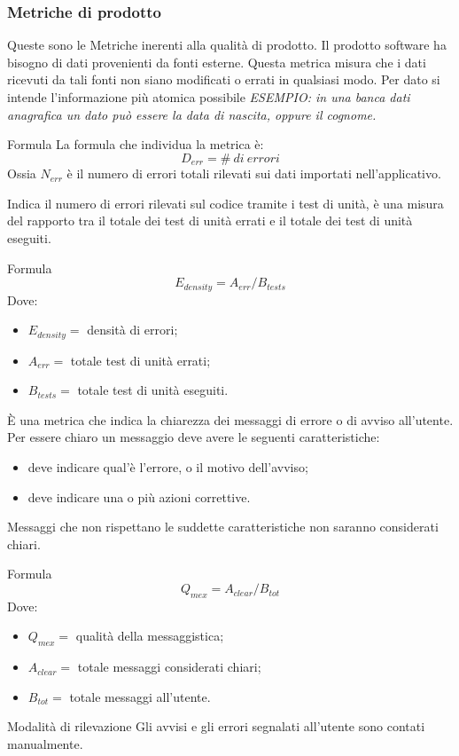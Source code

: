 \subsubsection{Metriche di prodotto}
Queste sono le Metriche inerenti alla qualità di prodotto.
Il prodotto software ha bisogno di dati provenienti da fonti esterne. Questa 
metrica misura che i dati ricevuti da tali fonti non siano modificati o errati 
in qualsiasi modo. Per dato si intende l'informazione più atomica possibile
\textit{ESEMPIO: in una banca dati anagrafica un dato può essere la data di 
nascita, oppure il cognome.}
\par{Formula}
La formula che individua la metrica è:
\begin{displaymath}
  D_{err} = \#\ di\ errori
\end{displaymath}
Ossia $N_{err}$ è il numero di errori totali rilevati sui dati importati 
nell'applicativo.

Indica il numero di errori rilevati sul codice tramite i test di unità, è una 
misura del rapporto tra il totale dei test di unità errati e il totale dei test 
di unità eseguiti.
\par{Formula}
\begin{displaymath}
  E_{density} = A_{err}/B_{tests}
\end{displaymath}
Dove:
\begin{itemize}
  \item[] $E_{density} =$ densità di errori;
  \item[] $A_{err} =$ totale test di unità errati;  
  \item[] $B_{tests} =$ totale test di unità eseguiti.
\end{itemize}

È una metrica che indica la chiarezza dei messaggi di errore o di avviso 
all'utente. Per essere chiaro un messaggio deve avere le seguenti 
caratteristiche:
\begin{itemize}
  \item deve indicare qual'è l'errore, o il motivo dell'avviso;
  \item deve indicare una o più azioni correttive.
\end{itemize}
Messaggi che non rispettano le suddette caratteristiche non saranno considerati 
chiari.
\par{Formula}
\begin{displaymath}
  Q_{mex} = A_{clear}/B_{tot}
\end{displaymath}
Dove:
\begin{itemize}
  \item[] $Q_{mex} =$ qualità della messaggistica;
  \item[] $A_{clear} =$ totale messaggi considerati chiari; 
  \item[] $B_{tot} =$ totale messaggi all'utente.
\end{itemize}
\par{Modalità di rilevazione}
Gli avvisi e gli errori segnalati all'utente sono contati manualmente.

